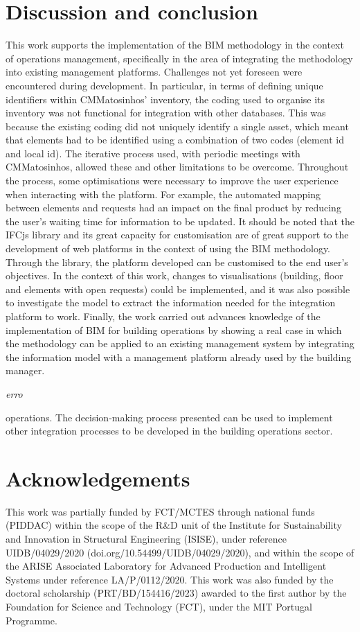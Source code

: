 \documentclass[a4paper, 10pt, twocolumn, twoside]{article}
\begin{document}
\section{Discussion and conclusion}
\label{sec:conclusion}

This work supports the implementation of the BIM methodology in the context of operations management, specifically in the area of integrating the methodology into existing management platforms. Challenges not yet foreseen were encountered during development. In particular, in terms of defining unique identifiers within CMMatosinhos' inventory, the coding used to organise its inventory was not functional for integration with other databases. This was because the existing coding did not uniquely identify a single asset, which meant that elements had to be identified using a combination of two codes (element id and local id). The iterative process used, with periodic meetings with CMMatosinhos, allowed these and other limitations to be overcome. Throughout the process, some optimisations were necessary to improve the user experience when interacting with the platform. For example, the automated mapping between elements and requests had an impact on the final product by reducing the user's waiting time for information to be updated. It should be noted that the IFCjs library and its great capacity for customisation are of great support to the development of web platforms in the context of using the BIM methodology. Through the library, the platform developed can be customised to the end user's objectives. In the context of this work, changes to visualisations (building, floor and elements with open requests) could be implemented, and it was also possible to investigate the model to extract the information needed for the integration platform to work. Finally, the work carried out advances knowledge of the implementation of BIM for building operations by showing a real case in which the methodology can be applied to an existing management system by integrating the information model with a management platform already used by the building manager.

\emph{erro}

operations. The decision-making process presented can be used to implement other integration processes to be developed in the building operations sector.

\section{Acknowledgements}
\label{sec:acknowledgements}

This work was partially funded by FCT/MCTES through national funds (PIDDAC) within the scope of the R\&D unit of the Institute for Sustainability and Innovation in Structural Engineering (ISISE), under reference UIDB/04029/2020 (doi.org/10.54499/UIDB/04029/2020), and within the scope of the ARISE Associated Laboratory for Advanced Production and Intelligent Systems under reference LA/P/0112/2020. This work was also funded by the doctoral scholarship (PRT/BD/154416/2023) awarded to the first author by the Foundation for Science and Technology (FCT), under the MIT Portugal Programme.


\end{document}
